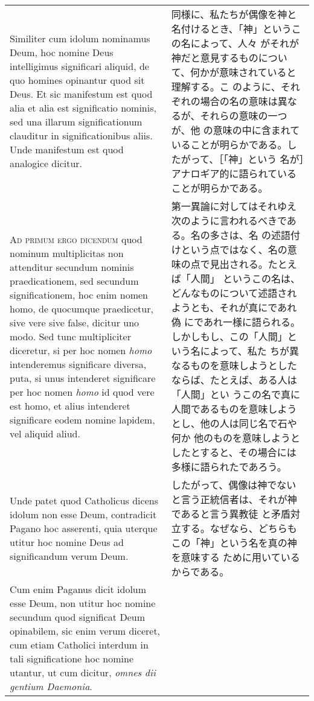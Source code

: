 \documentclass[10pt]{jsarticle}
\begin{document}
\begin{longtable}{p{21em}p{21em}}
Similiter cum idolum nominamus Deum, hoc nomine Deus intelligimus
significari aliquid, de quo homines opinantur quod sit Deus. Et sic
manifestum est quod alia et alia est significatio nominis, sed una
illarum significationum clauditur in significationibus aliis. Unde
manifestum est quod analogice dicitur.

&

同様に、私たちが偶像を神と名付けるとき、「神」というこの名によって、人々
がそれが神だと意見するものについて、何かが意味されていると理解する。こ
のように、それぞれの場合の名の意味は異なるが、それらの意味の一つが、他
の意味の中に含まれていることが明らかである。したがって、［「神」という
名が］アナロギア的に語られていることが明らかである。

\\

{\scshape Ad primum ergo dicendum} quod nominum multiplicitas non
attenditur secundum nominis praedicationem, sed secundum
significationem, hoc enim nomen homo, de quocumque praedicetur, sive
vere sive false, dicitur uno modo. Sed tunc multipliciter diceretur,
si per hoc nomen {\itshape homo} intenderemus significare diversa,
puta, si unus intenderet significare per hoc nomen {\itshape homo} id
quod vere est homo, et alius intenderet significare eodem nomine
lapidem, vel aliquid aliud.

&

第一異論に対してはそれゆえ次のように言われるべきである。名の多さは、名
の述語付けという点ではなく、名の意味の点で見出される。たとえば「人間」
というこの名は、どんなものについて述語されようとも、それが真にであれ偽
にであれ一様に語られる。しかしもし、この「人間」という名によって、私た
ちが異なるものを意味しようとしたならば、たとえば、ある人は「人間」とい
うこの名で真に人間であるものを意味しようとし、他の人は同じ名で石や何か
他のものを意味しようとしたとすると、その場合には多様に語られたであろう。

\\

Unde patet quod Catholicus dicens idolum non esse Deum, contradicit
Pagano hoc asserenti, quia uterque utitur hoc nomine Deus ad
significandum verum Deum.

&

したがって、偶像は神でないと言う正統信者は、それが神であると言う異教徒
と矛盾対立する。なぜなら、どちらもこの「神」という名を真の神を意味する
ために用いているからである。

\\

Cum enim Paganus dicit idolum esse Deum, non utitur hoc nomine
secundum quod significat Deum opinabilem, sic enim verum diceret, cum
etiam Catholici interdum in tali significatione hoc nomine utantur, ut
cum dicitur, {\itshape omnes dii gentium Daemonia}.


\end{longtable}
\end{document}
